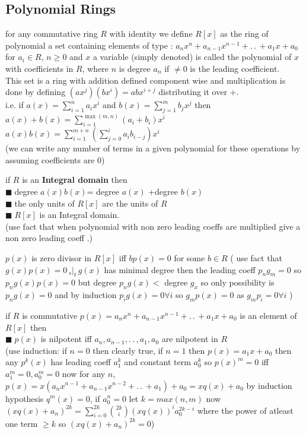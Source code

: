 \documentclass[11pt]{extarticle}
\newcommand{\ck}{.\,.\,}
\newcommand{\snote}[1]{{\footnotesize(#1)}}
\newcommand{\st}{\,{}_{s}|_t\,}
\newcommand{\tbx}[2][]{
	\begin{tcolorbox}[enhanced,breakable,size=small,colback=black!2!white,title={#1},arc is angular, arc=1.5mm,drop fuzzy shadow]
		#2
	\end{tcolorbox}
}
\newcommand{\y}{$\blacksquare\;$}
\begin{document}
\begin{multicols}{2}
		\section{Polynomial Rings} 

\tbx{for any commutative ring $ R $ with identity we define $ R[x] $ as the ring of polynomial a set containing elements of type :
			$ a_nx^n+a_{n-1}x^{n-1}+\ck +a_1x+a_0 $ for $ a_i\in R $, $ n\geq 0 $ and $ x $ a variable \snote{simply denoted} is called the polynomial of $ x $ with coefficients in $ R $, where  $ n $ is degree $ a_n $ if $ \neq 0 $ is the leading coefficient.\\
			This set is a ring with addition defined component wise and multiplication is done by defining 
			$ (ax^j)(bx^i)=abx^{i+j} $ distributing it over $ + $. \\
			i.e. if $ a(x)=\sum_{i=1}^{n}a_i x^i$ and $ b(x)=\sum_{j=1}^{m} b_j x^j$ then
			$ a(x)+b(x)=\sum_{i=1}^{\max(m,n)}(a_i+b_i)x^i $
			$ a(x)b(x)= \sum_{i=1}^{m+n}(\sum_{j=0}^{i}a_ib_{i-j})x^i$\\
			\snote{we can write any number of terms in a given polynomial for these operations by assuming coefficients are 0}
			} 
\tbx{ if 	$ R $ is an \textbf{Integral domain }then  \\
			\y degree $ a(x)b(x) $= degree $ a(x) $ +degree $b(x)$ \\
			\y the only units of $ R[x] $ are the units of $ R $ \\
			\y $ R[x] $ is an Integral domain. \\
			\snote{use fact that when polynomial with non zero leading coeffs are multiplied give a non zero leading coeff .}
			} 
\tbx{$ p(x) $ is zero divisor in $ R[x] $ iff $ bp(x)=0 $ for some $ b\in R $ 
			\snote{ use fact that $ g(x)p(x)=0 \st g(x) $ has minimal degree then the leading coeff $ p_ng_m=0 $ so $ p_ng(x)p(x)=0 $ but degree $ p_ng(x) <$ degree $ g_x$ so only possibility is $p_ng(x)=0$  and by induction $ p_ig(x)=0 \forall i $ so $ g_mp(x)=0 $ as $ g_mp_i=0 \forall i $  }
			} 
\tbx{if $ R $ is commutative $ p(x)=a_nx^n+a_{n-1}x^{n-1}+\ck +a_1 x+a_0 $ is an element of $ R[x] $ then\\
			\y $ p(x) $ is nilpotent iff $ a_n , a_{n-1},\ck , a_1,a_0$ are nilpotent in $ R $  \\
			\snote{use induction: if $ n=0 $ then clearly true, if $ n=1 $ then $ p(x)=a_1x+a_0 $ then any $ p^k(x) $ has leading coeff $ a_1^k $ and constant term $ a_0^k $ so $ p(x)^m=0 $ iff $a_1^m=0,a_0^m=0 $ now for any $ n $, $ p(x)=x(a_nx^{n-1}+a_{n-1}x^{n-2}+\ck +a_1)+a_0 =xq(x)+a_0$ by induction hypothesis $ q^m(x)=0 $, if $ a_0^n=0 $ let $ k=max(n,m) $ now $ (xq(x)+a_n)^{2k}=\sum_{i=0}^{2k} {2k\choose i } (xq(x))^{i}a_0^{2k-i} $ where the power of atleast one term $ \geq k $ so $ (xq(x)+a_n)^{2k} =0 $}
}
\end{multicols}
\end{document}
